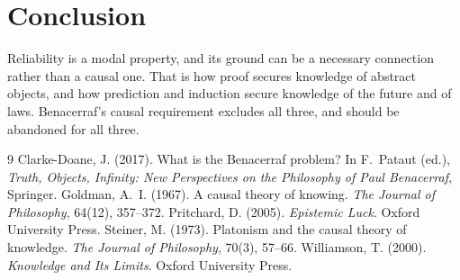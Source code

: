 \documentclass{situationist-preprint}
\begin{document}
\section{Conclusion}

Reliability is a modal property, and its ground can be a necessary connection rather than a causal one. That is how proof secures knowledge of abstract objects, and how prediction and induction secure knowledge of the future and of laws. Benacerraf's causal requirement excludes all three, and should be abandoned for all three.

\begin{thebibliography}{9}\small
{} Clarke-Doane, J. (2017). What is the Benacerraf problem? In F.~Pataut (ed.), \emph{Truth, Objects, Infinity: New Perspectives on the Philosophy of Paul Benacerraf}, Springer.
 Goldman, A.~I. (1967). A causal theory of knowing. \emph{The Journal of Philosophy}, 64(12), 357--372.
 Pritchard, D. (2005). \emph{Epistemic Luck}. Oxford University Press.
 Steiner, M. (1973). Platonism and the causal theory of knowledge. \emph{The Journal of Philosophy}, 70(3), 57--66.
 Williamson, T. (2000). \emph{Knowledge and Its Limits}. Oxford University Press.
\end{thebibliography}
\end{document}
